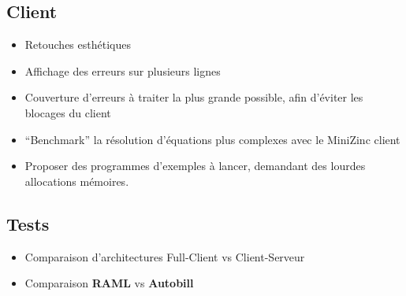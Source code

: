 \documentclass[12pt]{article}
\begin{document}
\hypertarget{client}{%
  \subsection{Client}\label{client}}

\begin{itemize}
  \tightlist
  \item
        Retouches esthétiques
  \item
        Affichage des erreurs sur plusieurs lignes
  \item
        Couverture d'erreurs à traiter la plus grande possible, afin d'éviter
        les blocages du client
  \item
        ``Benchmark'' la résolution d'équations plus complexes avec le
        MiniZinc client
  \item
        Proposer des programmes d'exemples à lancer, demandant des lourdes
        allocations mémoires.
\end{itemize}

\hypertarget{tests}{%
  \subsection{Tests}\label{tests}}

\begin{itemize}
  \item
        Comparaison d'architectures Full-Client vs Client-Serveur
  \item
        Comparaison \textbf{RAML} vs \textbf{Autobill}
\end{itemize}

\newpage



\end{document}
